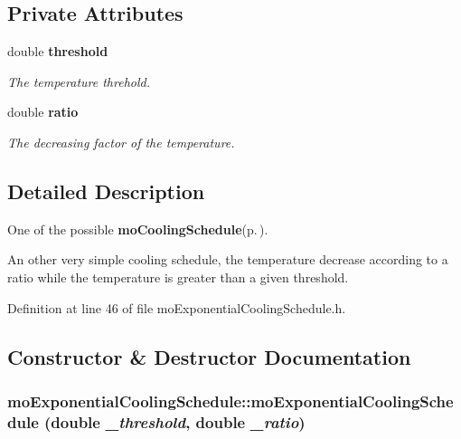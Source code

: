 \subsection*{Private Attributes}
\begin{CompactItemize}
\item 
double {\bf threshold}\label{classmo_exponential_cooling_schedule_r0}

\begin{CompactList}\small\item\em The temperature threhold. \item\end{CompactList}\item 
double {\bf ratio}\label{classmo_exponential_cooling_schedule_r1}

\begin{CompactList}\small\item\em The decreasing factor of the temperature. \item\end{CompactList}\end{CompactItemize}


\subsection{Detailed Description}
One of the possible {\bf mo\-Cooling\-Schedule}{\rm (p.\,\pageref{classmo_cooling_schedule})}. 

An other very simple cooling schedule, the temperature decrease according to a ratio while the temperature is greater than a given threshold. 



Definition at line 46 of file mo\-Exponential\-Cooling\-Schedule.h.

\subsection{Constructor \& Destructor Documentation}
\subsubsection{\setlength{\rightskip}{0pt plus 5cm}mo\-Exponential\-Cooling\-Schedule::mo\-Exponential\-Cooling\-Schedule (double {\em \_\-threshold}, double {\em \_\-ratio})\hspace{0.3cm}{\tt  [inline]}}\label{classmo_exponential_cooling_schedule_a0}


